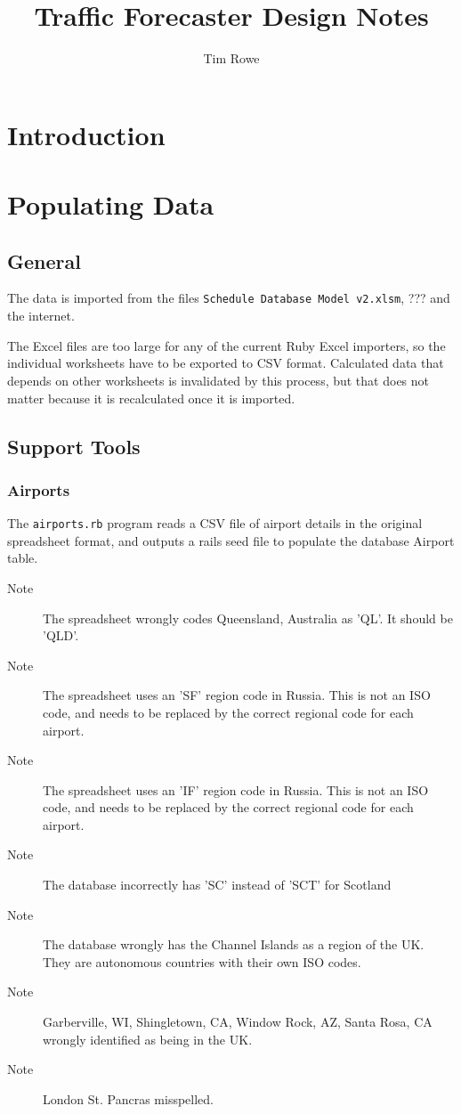 \documentclass[]{report}
\title{Traffic Forecaster Design Notes}
\author{Tim Rowe}
\begin{document}
\maketitle
\begin{abstract}
\end{abstract}
\tableofcontents
\listoffigures
\listoftables
\chapter{Introduction}
\chapter{Populating Data}
\section{General}
The data is imported from the files \verb|Schedule Database Model v2.xlsm|, ??? and the internet.

The Excel files are too large for any of the current Ruby Excel importers, so the individual worksheets have to be exported to CSV format. Calculated data that depends on other worksheets is invalidated by this process, but that does not matter because it is recalculated once it is imported.
\section{Support Tools}
\subsection{Airports}
The \verb!airports.rb! program reads a CSV file of airport details in the original spreadsheet format, and outputs a rails seed file to populate the database Airport table.
\begin{description}
\item[Note]The spreadsheet wrongly codes Queensland, Australia as 'QL'. It should be 'QLD'.
\item[Note]The spreadsheet uses an 'SF' region code in Russia. This is not an ISO code, and needs to be replaced by the correct regional code for each airport.
\item[Note]The spreadsheet uses an 'IF' region code in Russia. This is not an ISO code, and needs to be replaced by the correct regional code for each airport.
\item[Note]The database incorrectly has 'SC' instead of 'SCT' for Scotland
\item[Note]The database wrongly has the Channel Islands as a region of the UK. They are autonomous countries with their own ISO codes.
\item[Note]Garberville, WI, Shingletown, CA, Window Rock, AZ, Santa Rosa, CA wrongly identified as being in the UK.
\item[Note]London St. Pancras misspelled.
\end{description}
\end{document}
